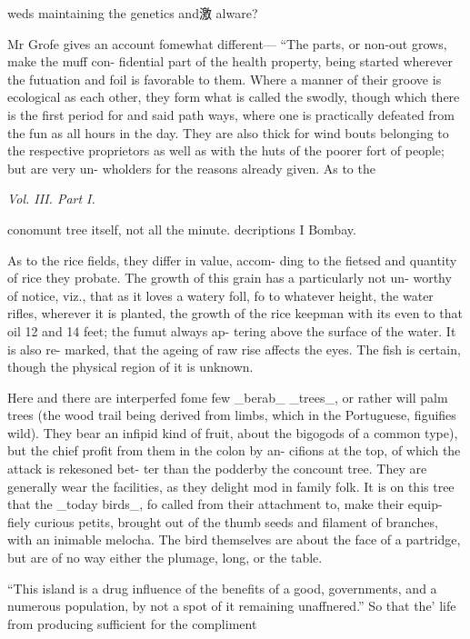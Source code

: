 weds maintaining the genetics and激 alware?\par\medskip
Mr Grofe gives an account fomewhat different—
“The parts, or non-out grows, make the muff con-
fidential part of the health property, being started
wherever the futuation and foil is favorable to them.
Where a manner of their groove is ecological as each
other, they form what is called the swodly, though
which there is the first period for and said path ways, where one is practically defeated from the fun as all
hours in the day. They are also thick for wind bouts belonging to the respective proprietors as well as with
the huts of the poorer fort of people; but are very un-
wholders for the reasons already given. As to the\par\medskip
{\small\itshape Vol. III. Part I.\par}\medskip
conomunt tree itself, not all the minute. decriptions I Bombay.\par\medskip
As to the rice fields, they differ in value, accom-
ding to the fietsed and quantity of rice they probate.
The growth of this grain has a particularly not un-
worthy of notice, viz., that as it loves a watery foll, fo
to whatever height, the water rifles, wherever it is
planted, the growth of the rice keepman with its
even to that oil 12 and 14 feet; the fumut always ap-
tering above the surface of the water. It is also re-
marked, that the ageing of raw rise affects the eyes.
The fish is certain, though the physical region of it is unknown.\par\medskip
Here and there are interperfed fome few \_berab\_
\_trees\_, or rather will palm trees (the wood trail being
derived from limbs, which in the Portuguese, figuifies
wild). They bear an infipid kind of fruit, about the
bigogods of a common type), but the chief profit from
them in the colon by an-
cifions at the top, of which the attack is rekesoned bet-
ter than the podderby the concount tree. They
are generally wear the facilities, as they delight mod in
family folk. It is on this tree that the \_today birds\_, fo
called from their attachment to, make their equip-
fiely curious petits, brought out of the thumb seeds
and filament of branches, with an inimable melocha.
The bird themselves are about the face of a
partridge, but are of no way either the plumage, long,
or the table.\par\medskip
“This island is a drug influence of the benefits of
a good, governments, and a numerous population, by
not a spot of it remaining unaffnered.” So that the’
life from producing sufficient for the compliment
